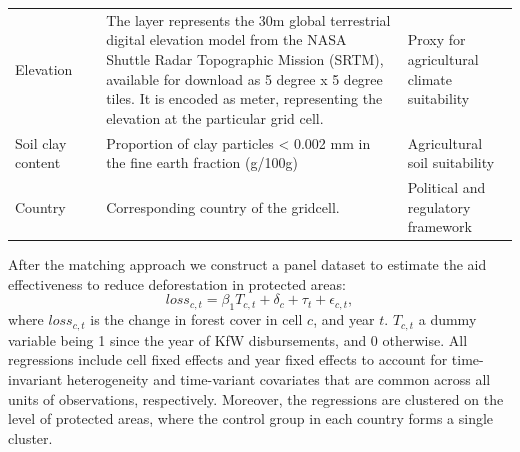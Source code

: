 \documentclass{article}
\begin{document}
\begin{table}[h]
\begin{tabular}{L{2cm}L{2cm}L{9cm}L{3cm}}
Elevation                                                              & \cite{farr2007shuttle}                        & The layer represents the 30m global terrestrial digital elevation model from the NASA Shuttle Radar Topographic Mission (SRTM), available for download as 5 degree x 5 degree tiles. It is encoded as meter, representing the elevation at the particular grid cell.                                                                                                                                                            & Proxy for agricultural climate suitability                                                   \\
Soil clay content                                                      & \cite{hengl2017soilgrids250m}                  & Proportion of clay particles < 0.002 mm in the fine earth fraction (g/100g)                                                                                                                                                                                                                                                                                                                                                     & Agricultural soil suitability                                                                \\
Country                                                                & \cite{}                                        & Corresponding country of the gridcell.                                                                                                                                                                                                                                                                                                                                                                                          & Political and regulatory framework                                                          \\
 \bottomrule

\end{tabular}
\end{table}


After the matching approach we construct a panel dataset to estimate the aid effectiveness to reduce deforestation in protected areas:
\begin{equation}
	\ensuremath{loss_{c,t}=\beta_{1}T_{c,t}+\delta_{c}+\tau_{t}+\epsilon_{c,t}},
\end{equation}
where $loss_{c,t}$ is the change in forest cover in cell $c$, and year $t$. $T_{c,t}$ a dummy variable being 1 since the year of KfW disbursements, and 0 otherwise. All regressions include cell fixed effects and year fixed effects to account for time-invariant heterogeneity and time-variant covariates that are common across all units of observations, respectively. Moreover, the regressions are clustered on the level of protected areas, where the control group in each country forms a single cluster.
\end{document}
